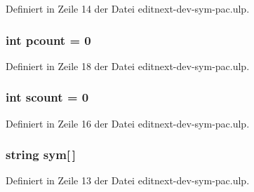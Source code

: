 Definiert in Zeile 14 der Datei editnext-\/dev-\/sym-\/pac.\+ulp.

\hypertarget{editnext-dev-sym-pac_8ulp_a747fe457bac32c34b78b69f9bfefd6f3}{}
\subsubsection[{pcount}]{\setlength{\rightskip}{0pt plus 5cm}int pcount = 0}\label{editnext-dev-sym-pac_8ulp_a747fe457bac32c34b78b69f9bfefd6f3}


Definiert in Zeile 18 der Datei editnext-\/dev-\/sym-\/pac.\+ulp.

\hypertarget{editnext-dev-sym-pac_8ulp_a7ad37c8d993b00d12609dd9ae98ec650}{}
\subsubsection[{scount}]{\setlength{\rightskip}{0pt plus 5cm}int scount = 0}\label{editnext-dev-sym-pac_8ulp_a7ad37c8d993b00d12609dd9ae98ec650}


Definiert in Zeile 16 der Datei editnext-\/dev-\/sym-\/pac.\+ulp.

\hypertarget{editnext-dev-sym-pac_8ulp_a618376f21731b07801ed522f58f270ed}{}
\subsubsection[{sym}]{\setlength{\rightskip}{0pt plus 5cm}string sym\mbox{[}$\,$\mbox{]}}\label{editnext-dev-sym-pac_8ulp_a618376f21731b07801ed522f58f270ed}


Definiert in Zeile 13 der Datei editnext-\/dev-\/sym-\/pac.\+ulp.

